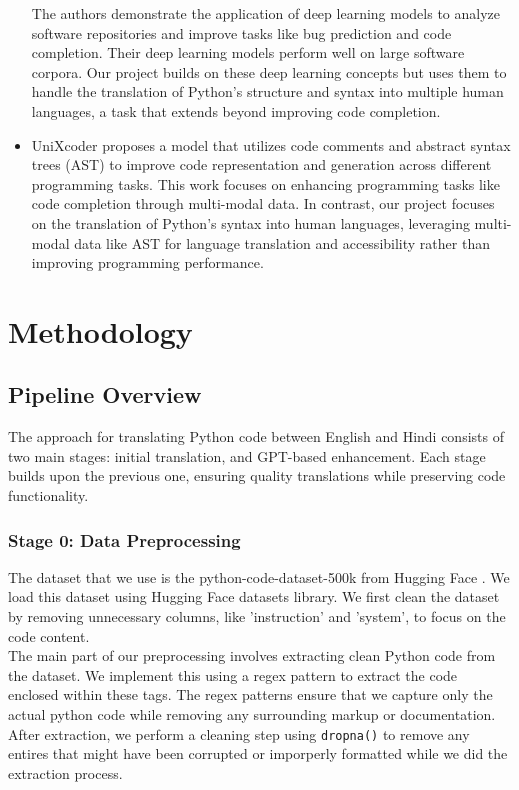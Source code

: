\documentclass[11pt,a4paper]{article}
\begin{document}
\begin{itemize}
  The authors demonstrate the application of deep learning models to analyze software repositories and improve tasks like bug prediction and code completion. Their deep learning models perform well on large software corpora. Our project builds on these deep learning concepts but uses them to handle the translation of Python's structure and syntax into multiple human languages, a task that extends beyond improving code completion. 
  
  \item \cite{10.1109/ASE56229.2023.00076}
  
  UniXcoder proposes a model that utilizes code comments and abstract syntax trees (AST) to improve code representation and generation across different programming tasks. This work focuses on enhancing programming tasks like code completion through multi-modal data. In contrast, our project focuses on the translation of Python's syntax into human languages, leveraging multi-modal data like AST for language translation and accessibility rather than improving programming performance. 
\end{itemize}

\section {Methodology}
\subsection{Pipeline Overview}
The approach for translating Python code between English and Hindi consists of two main stages: initial translation, and GPT-based enhancement. Each stage builds upon the previous one, ensuring quality translations while preserving code functionality.
\subsubsection{Stage 0: Data Preprocessing}
The dataset that we use is the python-code-dataset-500k from Hugging Face \cite{jtatman2021python}. We load this dataset using Hugging Face datasets library. We first clean the dataset by removing unnecessary columns, like 'instruction' and 'system', to focus on the code content.\\ 

The main part of our preprocessing involves extracting clean Python code from the dataset. We implement this using a regex pattern to extract the code enclosed within these tags. The regex patterns ensure that we capture only the actual python code while removing any surrounding markup or documentation. After extraction, we perform a cleaning step using \texttt{dropna()} to remove any entires that might have been corrupted or imporperly formatted while we did the extraction process.\\ 
\end{document}
